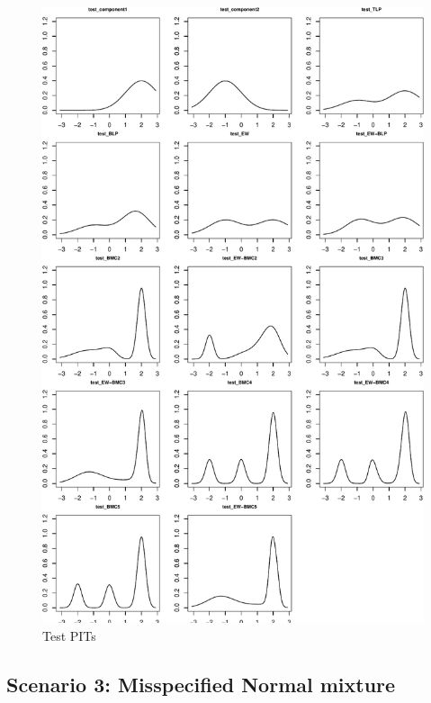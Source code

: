 \documentclass[
]{article}
\begin{document}
\clearpage

\begin{figure}[h]

{\centering \includegraphics{applied_blp_sim_files/figure-latex/unnamed-chunk-21-1} 

}

\caption{Test PITs}\label{fig:unnamed-chunk-21}
\end{figure}
\clearpage

\hypertarget{scenario-3-misspecified-normal-mixture}{%
\subsection{Scenario 3: Misspecified Normal
mixture}\label{scenario-3-misspecified-normal-mixture}}
\end{document}
